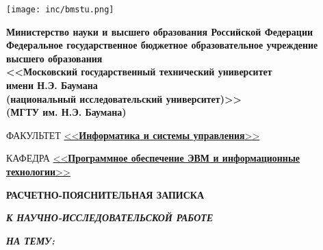 \documentclass[ut8x, 14pt, oneside, a4paper]{extarticle}
\begin{document}
	\begin{titlepage}
		\noindent\begin{minipage}{0.05\textwidth}
			\texttt{[image: inc/bmstu.png]}
		\end{minipage}
		\hfill
		\begin{minipage}{0.85\textwidth}\raggedleft
			\begin{center}
				\fontsize{12pt}{0.3\baselineskip}\selectfont \textbf{Министерство науки и высшего образования Российской Федерации \\ Федеральное государственное бюджетное образовательное учреждение \\ высшего образования \\ <<Московский государственный технический университет \\ имени Н.Э. Баумана \\ (национальный исследовательский университет)>> \\ (МГТУ им. Н.Э. Баумана)}
			\end{center}
		\end{minipage}
		
		\begin{center}
			\fontsize{12pt}{0.1\baselineskip}\selectfont
			\noindent\makebox[\linewidth]{\rule{\textwidth}{4pt}} \makebox[\linewidth]{\rule{\textwidth}{1pt}}
		\end{center}
		
		\begin{flushleft}
			\fontsize{12pt}{0.8\baselineskip}\selectfont 
			
			ФАКУЛЬТЕТ \uline{<<\textbf{Информатика и системы управления}>> \hfill}
			
			КАФЕДРА \uline{\mbox{\hspace{4mm}} <<\textbf{Программное обеспечение ЭВМ и информационные технологии}>> \hfill}
		\end{flushleft}
		
		\vfill
		
		\begin{center}
			\fontsize{20pt}{\baselineskip}\selectfont
			
			\textbf{РАСЧЕТНО-ПОЯСНИТЕЛЬНАЯ ЗАПИСКА}
			
			\textbf{\textit{К НАУЧНО-ИССЛЕДОВАТЕЛЬСКОЙ РАБОТЕ}}
			
			\textbf{\textit{НА ТЕМУ:}}
		\end{center}
		
		\begin{center}
			\fontsize{18pt}{0.6cm}\selectfont 
			

\end{center}
\end{titlepage}
\end{document}
